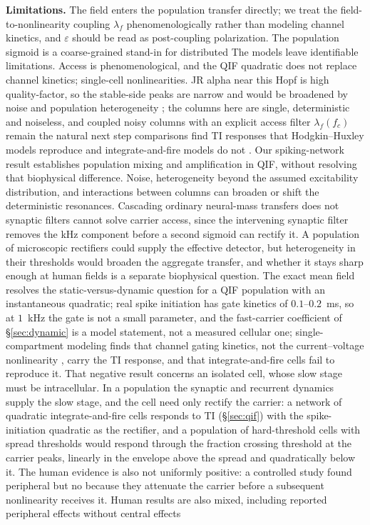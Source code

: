 \documentclass[11pt,a4paper]{article}
\providecommand{\DIFaddtex}[1]{{\protect\color{blue} \sf #1}} %
\providecommand{\DIFdeltex}[1]{{\protect\color{red} \scriptsize #1}} %
\providecommand{\DIFaddbegin}{} %
\providecommand{\DIFaddend}{} %
\providecommand{\DIFdelbegin}{} %
\providecommand{\DIFdelend}{} %
\providecommand{\DIFadd}[1]{\texorpdfstring{\DIFaddtex{#1}}{#1}} %
\providecommand{\DIFdel}[1]{\texorpdfstring{\DIFdeltex{#1}}{}} %
\begin{document}
\DIFdelbegin \DIFdel{\textbf{Limitations.} The field enters the population transfer directly; we treat the
field-to-nonlinearity coupling $\lambda_f$ phenomenologically rather than modeling
channel kinetics, and $\varepsilon$ should be read as post-coupling polarization. The
population sigmoid is a coarse-grained stand-in for distributed }\DIFdelend \DIFaddbegin \DIFadd{The models leave identifiable limitations. Access is phenomenological, and the
QIF quadratic does not replace channel kinetics; }\DIFaddend single-cell \DIFdelbegin \DIFdel{nonlinearities.
JR alpha near this Hopf is high quality-factor, so the stable-side peaks are narrow and
would be broadened by noise and population heterogeneity ; the columns here are single, deterministic and noiseless, and coupled noisy columns with an explicit access filter
$\lambda_f(f_c)$ remain the natural next step}\DIFdelend \DIFaddbegin \DIFadd{comparisons find
TI responses that Hodgkin--Huxley models reproduce and integrate-and-fire models
do not \cite{plovie2025}. Our spiking-network result establishes population mixing
and amplification in QIF, without resolving that biophysical difference. Noise,
heterogeneity beyond the assumed excitability distribution, and interactions
between columns can broaden or shift the deterministic resonances}\DIFaddend . Cascading
ordinary \DIFdelbegin \DIFdel{neural-mass transfers does not }\DIFdelend \DIFaddbegin \DIFadd{synaptic filters cannot }\DIFaddend solve carrier access, \DIFdelbegin \DIFdel{since the intervening synaptic filter removes the kHz component before a second sigmoid can rectify it. A population of microscopic rectifiers could supply the
effective detector, but heterogeneity in their thresholds would broaden the aggregate
transfer, and whether it stays sharp enough at human fields is a separate biophysical
question. The exact mean field resolves the static-versus-dynamic question for a QIF
population with an instantaneous quadratic; real spike initiation has gate kinetics of
$0.1$--$0.2$~ms, so at $1$~kHz the gate is not a small parameter, and the fast-carrier
coefficient of \S\ref{sec:dynamic} is a model statement, not a measured cellular one;
single-compartment modeling finds that channel gating kinetics, not the current--voltage
nonlinearity , carry the TI response, and that integrate-and-fire cells fail to reproduce
it\cite{plovie2025}. That negative result concerns an isolated cell, whose slow stage
must be intracellular. In a population the synaptic and recurrent dynamics supply the slow
stage, and the cell need only rectify the carrier: a network of quadratic
integrate-and-fire cells responds to TI (\S\ref{sec:qif}) with the spike-initiation
quadratic as the rectifier, and a population of hard-threshold cells with spread
thresholds would respond through the fraction crossing threshold at the carrier peaks,
linearly in the envelope above the spread and quadratically below it. The human evidence is also
not uniformly positive: a
controlled study found peripheral but no }\DIFdelend \DIFaddbegin \DIFadd{because they attenuate
the carrier before a subsequent nonlinearity receives it. Human results are also
mixed, including reported peripheral effects without }\DIFaddend central effects
\end{document}
